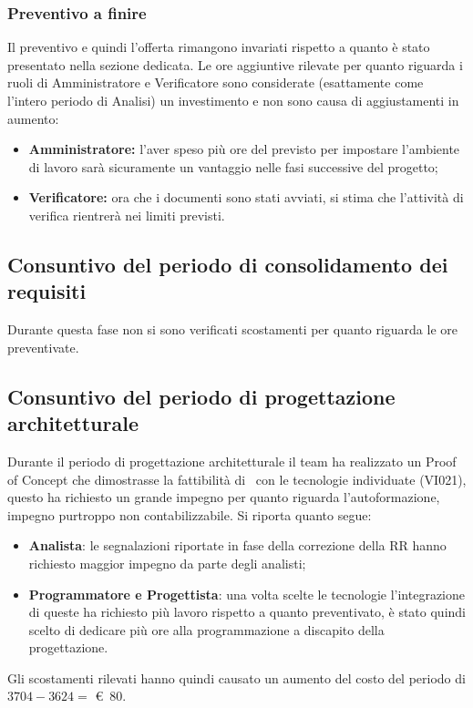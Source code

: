 \subsubsection{Preventivo a finire}
Il preventivo e quindi l'offerta rimangono invariati rispetto a quanto è stato presentato nella sezione dedicata. Le ore aggiuntive rilevate per quanto riguarda i ruoli di Amministratore e Verificatore sono considerate (esattamente come l'intero periodo di Analisi) un investimento e non sono causa di aggiustamenti in aumento: 
\begin{itemize}
    \item \textbf{Amministratore:} l'aver speso più ore del previsto per impostare l'ambiente di lavoro sarà sicuramente un vantaggio nelle fasi successive del progetto;
    \item \textbf{Verificatore:} ora che i documenti sono stati avviati, si stima che l'attività di verifica rientrerà nei limiti previsti.
\end{itemize}

\subsection{Consuntivo del periodo di consolidamento dei requisiti}
Durante questa fase non si sono verificati scostamenti per quanto riguarda le ore preventivate. 

\subsection{Consuntivo del periodo di progettazione architetturale}
Durante il periodo di progettazione architetturale il team ha realizzato un Proof of Concept che dimostrasse la fattibilità di \hd\ con le tecnologie individuate (VI021), questo ha richiesto un grande impegno per quanto riguarda l'autoformazione, impegno purtroppo non contabilizzabile. 
Si riporta quanto segue:
\begin{itemize}
    \item \textbf{Analista}: le segnalazioni riportate in fase della correzione della RR hanno richiesto maggior impegno da parte degli analisti;
    \item \textbf{Programmatore e Progettista}: una volta scelte le tecnologie l'integrazione di queste ha richiesto più lavoro rispetto a quanto preventivato, è stato quindi scelto di dedicare più ore alla programmazione a discapito della progettazione.
\end{itemize}
\def\salarycontent{
    {Amministratore,13,20,260},
    {Analista,$26+\noexpand\textbf{6}$,25,800},
    {Progettista,$62-\noexpand\textbf{10}$,22,1144},
    {Programmatore,$31+\noexpand\textbf{10}$,15,615},
    {Responsabile,9,30,270},
    {Verificatore,41,15,615},
    {Totale,188,127,3704},
}

\noindent Gli scostamenti rilevati hanno quindi causato un aumento del costo del periodo di $3704 - 3624 =$ \euro\ 80.

